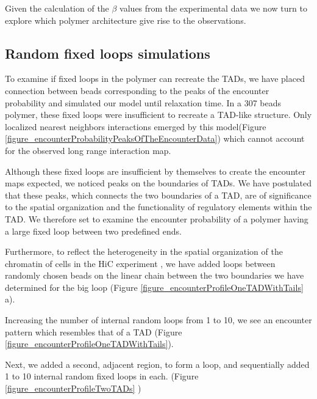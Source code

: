 \documentclass[12pt]{article}
\begin{document}
Given the calculation of the $\beta$ values from the experimental data we now turn to explore which polymer architecture give rise to the observations.

\subsection{Random fixed loops simulations}\label{subsection_randomFixedLoopsSimulations}
To examine if fixed loops in the polymer can recreate the TADs, we have placed connection between beads corresponding to the peaks of the encounter probability and simulated our model until relaxation time.
In a 307 beads polymer, these fixed loops were insufficient to recreate a TAD-like structure.
Only localized nearest neighbors interactions emerged by this model(Figure \ref{figure_encounterProbabilityPeaksOfTheEncounterData}) which cannot account for the observed long range interaction map.

Although these fixed loops are insufficient by themselves to create the encounter maps expected, we noticed peaks on the boundaries of TADs. We have postulated that these peaks, which connects the two boundaries of a TAD, are of significance to the spatial organization and the functionality of regulatory elements within the TAD.  We therefore set to examine the encounter probability of a polymer having a large fixed loop between two predefined ends.

Furthermore, to reflect the heterogeneity in the spatial organization of the chromatin of cells in the HiC experiment \cite{dekker2013exploring} \cite{Nora2012}, we have added loops between randomly chosen beads on the linear chain between the two boundaries we have determined for the big loop (Figure \ref{figure_encounterProfileOneTADWithTails} a).

Increasing the number of internal random loops from 1 to 10, we see an encounter pattern which resembles that of a TAD (Figure \ref{figure_encounterProfileOneTADWithTails}).

Next, we added a second, adjacent region, to form a loop, and sequentially added 1 to 10 internal random fixed loops in each. (Figure \ref{figure_encounterProfileTwoTADs} ) %
\end{document}
